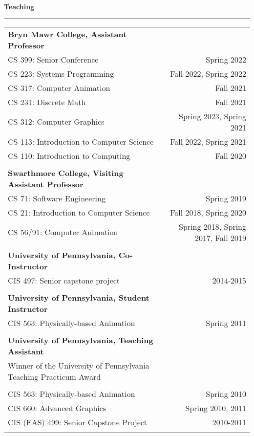 \needspace{6em}
{\large {\bf Teaching}}
\vspace{0.1cm}
\hrule
\begin{tabular*}{7.1in}{@{}l@{\extracolsep\fill}r}

{\bf Bryn Mawr College, Assistant Professor} & \\
CS 399: Senior Conference & Spring 2022\\
CS 223: Systems Programming & Fall 2022, Spring 2022\\
CS 317: Computer Animation & Fall 2021\\
CS 231: Discrete Math & Fall 2021\\
CS 312: Computer Graphics & Spring 2023, Spring 2021\\
CS 113: Introduction to Computer Science & Fall 2022, Spring 2021\\
CS 110: Introduction to Computing & Fall 2020\\
\phantom{yommomma} & \phantom{2002}\\

{\bf Swarthmore College, Visiting Assistant Professor} & \\
CS 71: Software Engineering & Spring 2019\\
CS 21: Introduction to Computer Science & Fall 2018, Spring 2020\\
CS 56/91: Computer Animation & Spring 2018, Spring 2017, Fall 2019\\
\phantom{yommomma} & \phantom{2002}\\

{\bf University of Pennsylvania, Co-Instructor} & \\
CIS 497: Senior capstone project & 2014-2015\\
\phantom{yommomma} & \phantom{2002}\\

{\bf University of Pennsylvania, Student Instructor} & \\
CIS 563: Physically-based Animation & Spring 2011\\
\phantom{yommomma} & \phantom{2002}\\
{\bf University of Pennsylvania, Teaching Assistant} & \\
Winner of the University of Pennsylvania Teaching Practicum Award & \\
\phantom{yommomma} & \phantom{2002}\\
CIS 563: Physically-based Animation & Spring 2010\\
CIS 660: Advanced Graphics & Spring 2010, 2011\\
CIS (EAS) 499: Senior Capstone Project  & 2010-2011\\
\phantom{yommomma} & \phantom{2002}\\
\end{tabular*}

